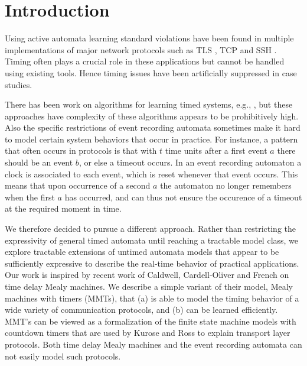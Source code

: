 \section{Introduction}
\label{sec:intro}

Using active automata learning standard violations have been found in multiple implementations of
major network protocols such as TLS \cite{dRP15}, TCP \cite{FJV16} and SSH \cite{FiterauEtAl17}.
Timing often plays a crucial role in these applications but cannot be handled using existing tools.
Hence timing issues have been artificially suppressed in case studies.

There has been work on algorithms for learning timed systems, e.g., \cite{GrinchteinJL10,MensM15,CCF16},
but these approaches have complexity of these algorithms appears to be prohibitively high.
Also the specific restrictions of event recording automata sometimes make it hard to model
certain system behaviors that occur in practice.
For instance, a pattern that often occurs in protocols is that with $t$ time units after a first event $a$
there should be an event $b$, or else a timeout occurs.
In an event recording automaton a clock is associated to each event, which is reset whenever that event occurs.
This means that upon occurrence of a second $a$ the automaton no longer remembers when the first $a$ has occurred,
and can thus not ensure the occurence of a timeout at the required moment in time.

We therefore decided to pursue a different approach. Rather than restricting the expressivity of general timed automata
until reaching a tractable model class, we explore tractable extensions of untimed automata models that appear to
be sufficiently expressive to describe the real-time behavior of practical applications.
%
Our work is inspired by recent work of Caldwell, Cardell-Oliver and French \cite{CCF16} on time delay Mealy machines.
We describe a simple variant of their model, Mealy machines with timers (MMTs), that 
(a) is able to model the timing behavior of a wide variety of communication protocols, and
(b) can be learned efficiently.
MMT's can be viewed as a formalization of the finite state machine models with countdown timers that are used by
Kurose and Ross \cite{KR13} to explain transport layer protocols.
Both time delay Mealy machines \cite{CCF16} and the event recording automata \cite{GrinchteinJL10} can not easily model such protocols.
 
